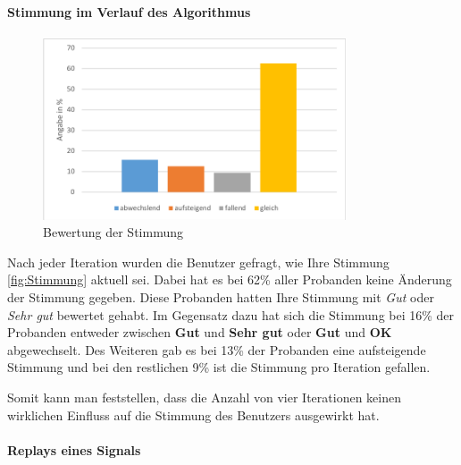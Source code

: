\paragraph{Stimmung im Verlauf des Algorithmus}

\begin{figure}[htbp] 
            \centering
   	\includegraphics[width=0.8\textwidth]{pics/analyse/person/Stimmung.png}
	\caption{Bewertung der Stimmung}
	\label{fig:Stimmung}
\end{figure}

Nach jeder Iteration wurden die Benutzer gefragt, wie Ihre Stimmung \autoref{fig:Stimmung} aktuell sei. 
Dabei hat es bei 62\% aller Probanden keine {\"A}nderung der Stimmung gegeben. 
Diese Probanden hatten Ihre Stimmung mit \textit{Gut} oder \textit{Sehr gut} bewertet gehabt. 
Im Gegensatz dazu hat sich die Stimmung bei 16\% der Probanden entweder zwischen \textbf{Gut} und \textbf{Sehr gut} oder \textbf{Gut} und \textbf{OK} abgewechselt. 
Des Weiteren gab es bei 13\% der Probanden eine aufsteigende Stimmung und bei den restlichen 9\% ist die Stimmung pro Iteration gefallen.

Somit kann man feststellen, dass die Anzahl von vier Iterationen keinen wirklichen Einfluss auf die Stimmung des Benutzers ausgewirkt hat.


\paragraph{Replays eines Signals}

